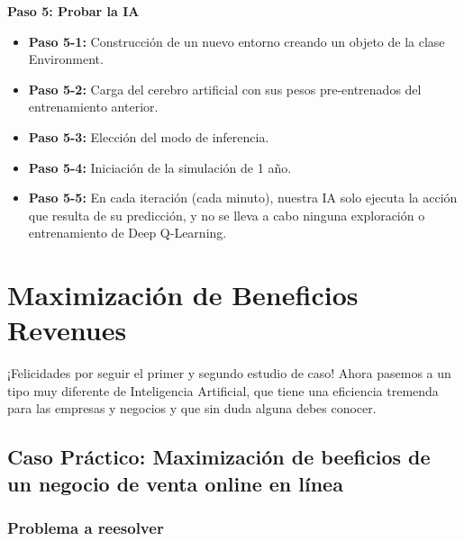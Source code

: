 \documentclass[
]{book}
\providecommand{\tightlist}{%
  \setlength{\itemsep}{0pt}\setlength{\parskip}{0pt}}
\begin{document}
\textbf{Paso 5: Probar la IA}

\begin{itemize}
\tightlist
\item
  \textbf{Paso 5-1:} Construcción de un nuevo entorno creando un objeto de la clase Environment.
\item
  \textbf{Paso 5-2:} Carga del cerebro artificial con sus pesos pre-entrenados del entrenamiento anterior.
\item
  \textbf{Paso 5-3:} Elección del modo de inferencia.
\item
  \textbf{Paso 5-4:} Iniciación de la simulación de 1 año.
\item
  \textbf{Paso 5-5:} En cada iteración (cada minuto), nuestra IA solo ejecuta la acción que resulta de su predicción, y no se lleva a cabo ninguna exploración o entrenamiento de Deep Q-Learning.
\end{itemize}

\hypertarget{maximizaciuxf3n-de-beneficios-revenues}{%
\chapter{Maximización de Beneficios Revenues}\label{maximizaciuxf3n-de-beneficios-revenues}}

¡Felicidades por seguir el primer y segundo estudio de caso! Ahora pasemos a un tipo muy diferente de Inteligencia Artificial, que tiene una eficiencia tremenda para las empresas y negocios y que sin duda alguna debes conocer.

\hypertarget{caso-pruxe1ctico-maximizaciuxf3n-de-beeficios-de-un-negocio-de-venta-online-en-luxednea}{%
\section{Caso Práctico: Maximización de beeficios de un negocio de venta online en línea}\label{caso-pruxe1ctico-maximizaciuxf3n-de-beeficios-de-un-negocio-de-venta-online-en-luxednea}}

\hypertarget{problema-a-reesolver}{%
\subsection{Problema a reesolver}\label{problema-a-reesolver}}
\end{document}

